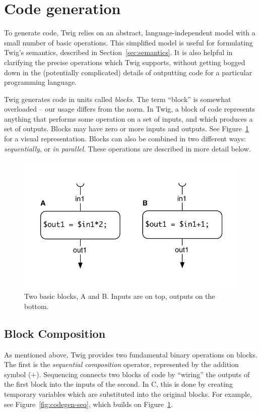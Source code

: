 
\section{Code generation}
\label{sec:code-gen}

To generate code, Twig relies on an abstract, language-independent model with a small number of basic operations. This simplified model is useful for formulating Twig's semantics, described in Section~\ref{sec:semantics}. It is also helpful in clarifying the precise operations which Twig supports, without getting bogged down in the (potentially complicated) details of outputting code for a particular programming language.

Twig generates code in units called \emph{blocks}. The term ``block'' is somewhat overloaded -- our usage differs from the norm. In Twig, a block of code represents anything that performs some operation on a set of inputs, and which produces a set of outputs. Blocks may have zero or more inputs and outputs. See Figure~\ref{fig:blocks} for a visual representation. Blocks can also be combined in two different ways: \emph{sequentially}, or \emph{in parallel}. These operations are described in more detail below.

\begin{figure}[ht]
\centering
\includegraphics[width=0.75\columnwidth]{images/code-gen1}
\caption{Two basic blocks, A and B. Inputs are on top, outputs on the bottom.}
\label{fig:blocks}
\end{figure}

\subsection{Block Composition}

As mentioned above, Twig provides two fundamental binary operations on blocks. The first is the \emph{sequential composition} operator, represented by the addition symbol ($+$). Sequencing connects two blocks of code by ``wiring'' the outputs of the first block into the inputs of the second. In C, this is done by creating temporary variables which are substituted into the original blocks. For example, see Figure~\ref{fig:codegen-seq}, which builds on Figure~\ref{fig:blocks}.

